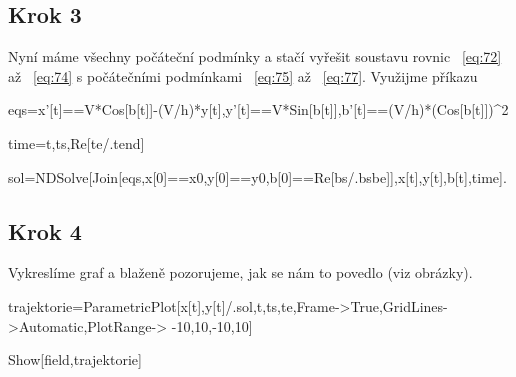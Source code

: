 \documentclass[reqno, a4paper]{amsart}
\begin{document}
\subsection*{Krok 3}
Nyní máme všechny počáteční podmínky a stačí vyřešit soustavu rovnic ~\eqref{eq:72} až ~\eqref{eq:74} s počátečními podmínkami ~\eqref{eq:75} až ~\eqref{eq:77}. Využijme příkazu
\begin{verbatim*}
	eqs={x'[t]==V*Cos[b[t]]-(V/h)*y[t],y'[t]==V*Sin[b[t]],b'[t]==(V/h)*(Cos[b[t]])^2}
	
	time={t,ts,Re[te/.tend]}
	
	sol=NDSolve[Join[eqs,{x[0]==x0,y[0]==y0,b[0]==Re[bs/.bsbe]}],{x[t],y[t],b[t]},time].
\end{verbatim*}
\subsection*{Krok 4}
Vykreslíme graf a blaženě pozorujeme, jak se nám to povedlo (viz obrázky).
\begin{verbatim*}
	trajektorie=ParametricPlot[{x[t],y[t]}/.sol,{t,ts,te},Frame->True,GridLines->Automatic,PlotRange->
	{{-10,10},{-10,10}}]
	
	Show[field,trajektorie]
\end{verbatim*}
\end{document}
